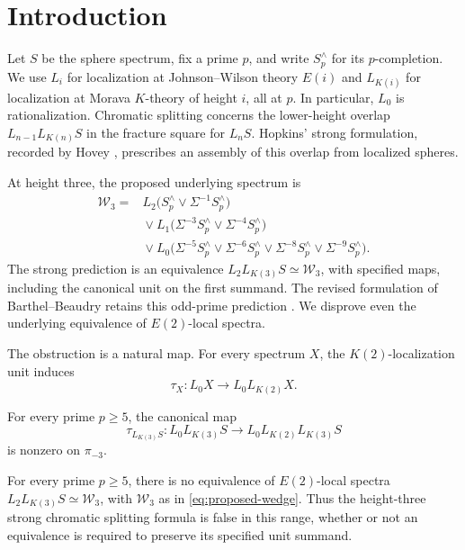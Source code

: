 \section{Introduction}
\label{sec:introduction}

Let \(S\) be the sphere spectrum, fix a prime \(p\), and write
\(S_p^\wedge\) for its \(p\)-completion. We use \(L_i\) for localization
at Johnson--Wilson theory \(E(i)\) and \(L_{K(i)}\) for localization at
Morava \(K\)-theory of height \(i\), all at \(p\). In particular, \(L_0\)
is rationalization. Chromatic splitting concerns the lower-height
overlap \(L_{n-1}L_{K(n)}S\) in the fracture square for \(L_nS\).
Hopkins' strong formulation, recorded by Hovey
\cite[Conjecture~4.2]{Hovey1995}, prescribes an assembly of this overlap
from localized spheres.

At height three, the proposed underlying spectrum is
\begin{equation}\label{eq:proposed-wedge}
\begin{aligned}
 \mathcal W_3={}&L_2\bigl(S_p^\wedge\vee\Sigma^{-1}S_p^\wedge\bigr)\\
 &{}\vee L_1\bigl(\Sigma^{-3}S_p^\wedge\vee\Sigma^{-4}S_p^\wedge\bigr)\\
 &{}\vee L_0\bigl(\Sigma^{-5}S_p^\wedge\vee\Sigma^{-6}S_p^\wedge
             \vee\Sigma^{-8}S_p^\wedge\vee\Sigma^{-9}S_p^\wedge\bigr).
\end{aligned}
\end{equation}
The strong prediction is an equivalence
\(L_2L_{K(3)}S\simeq\mathcal W_3\), with specified maps, including the
canonical unit on the first summand. The revised formulation of
Barthel--Beaudry retains this odd-prime prediction
\cite[Conjecture~6.3 and Remark~6.4]{BB2019}. We disprove even the
underlying equivalence of \(E(2)\)-local spectra.

The obstruction is a natural map. For every spectrum \(X\), the
\(K(2)\)-localization unit induces
\[
 \tau_X:L_0X\longrightarrow L_0L_{K(2)}X.
\]

\begin{theorem}\label{thm:main}
For every prime \(p\geq5\), the canonical map
\begin{equation}\label{eq:main-map}
 \tau_{L_{K(3)}S}:L_0L_{K(3)}S\longrightarrow
                         L_0L_{K(2)}L_{K(3)}S
\end{equation}
is nonzero on \(\pi_{-3}\).
\end{theorem}

\begin{corollary}\label{cor:strong}
For every prime \(p\geq5\), there is no equivalence of \(E(2)\)-local
spectra \(L_2L_{K(3)}S\simeq\mathcal W_3\), with \(\mathcal W_3\) as in
\eqref{eq:proposed-wedge}. Thus the height-three strong chromatic
splitting formula is false in this range, whether or not an equivalence
is required to preserve its specified unit summand.
\end{corollary}

